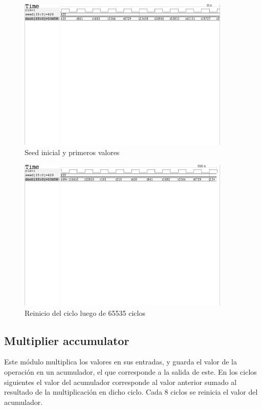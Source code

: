 \documentclass[letterpaper, 12pt]{article}
\numberwithin{equation}{section}
\begin{document}
\begin{figure}[H]
  \centering
  \includegraphics[width=0.9\textwidth]{../testbench/lfsr16/wave_lfsr_init.pdf}
  \caption{Seed inicial y primeros valores}
\end{figure}

\begin{figure}[H]
  \centering
  \includegraphics[width=0.9\textwidth]{../testbench/lfsr16/wave_lfsr_end.pdf}
  \caption{Reinicio del ciclo luego de 65535 ciclos}
\end{figure}

\subsection{Multiplier accumulator}

Este módulo multiplica los valores en sus entradas, y guarda el valor de la operación en un acumulador, el que corresponde a la salida de este. En los ciclos siguientes el valor del acumulador corresponde al valor anterior sumado al resultado de la multiplicación en dicho ciclo. Cada 8 ciclos se reinicia el valor del acumulador.
\end{document}
